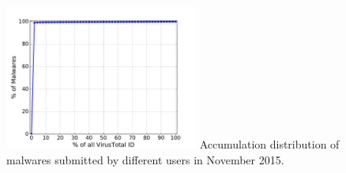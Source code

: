 \begin{figure}[t!]
\begin{center}
\includegraphics[width=2.5in]{figure/id}
{Accumulation distribution of malwares submitted by different users in November 2015.}
\end{center}
\vspace{-0.25in}
\end{figure}